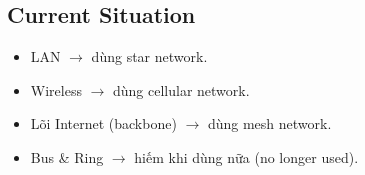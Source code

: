 \subsection{Current Situation}

\begin{itemize}
    \item LAN $\rightarrow$ dùng star network.
    \item Wireless $\rightarrow$ dùng cellular network.
    \item Lõi Internet (backbone) $\rightarrow$ dùng mesh network.
    \item Bus \& Ring $\rightarrow$ hiếm khi dùng nữa (no longer used).
\end{itemize}

\pagebreak
